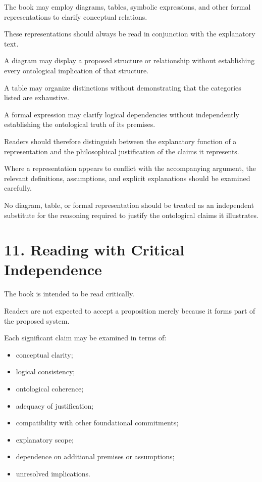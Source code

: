 The book may employ diagrams, tables,
symbolic expressions, and other formal
representations to clarify conceptual
relations.

These representations should always
be read in conjunction with the
explanatory text.

A diagram may display a proposed
structure or relationship without
establishing every ontological implication
of that structure.

A table may organize distinctions
without demonstrating that the categories
listed are exhaustive.

A formal expression may clarify logical
dependencies without independently
establishing the ontological truth of
its premises.

Readers should therefore distinguish
between the explanatory function of
a representation and the philosophical
justification of the claims it represents.

Where a representation appears to
conflict with the accompanying argument,
the relevant definitions, assumptions,
and explicit explanations should be
examined carefully.

No diagram, table, or formal representation
should be treated as an independent
substitute for the reasoning required
to justify the ontological claims it
illustrates.


\section*{11. Reading with Critical Independence}

The book is intended to be read critically.

Readers are not expected to accept a
proposition merely because it forms
part of the proposed system.

Each significant claim may be examined
in terms of:

\begin{itemize}

    \item conceptual clarity;

    \item logical consistency;

    \item ontological coherence;

    \item adequacy of justification;

    \item compatibility with other
    foundational commitments;

    \item explanatory scope;

    \item dependence on additional
    premises or assumptions;

    \item unresolved implications.

\end{itemize}

